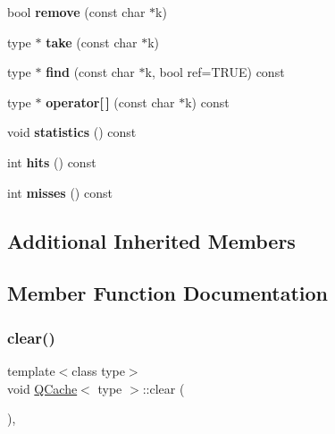 \begin{DoxyCompactItemize}
\item 
\mbox{\label{class_q_cache_af15e202b424c583974d00e269d782f42}} 
bool {\bfseries remove} (const char $\ast$k)
\item 
\mbox{\label{class_q_cache_ad2af9bf86686f51036cfca7f1c62804f}} 
type $\ast$ {\bfseries take} (const char $\ast$k)
\item 
\mbox{\label{class_q_cache_a1d4d4db95a948d64f780b533edccd95b}} 
type $\ast$ {\bfseries find} (const char $\ast$k, bool ref=T\+R\+UE) const
\item 
\mbox{\label{class_q_cache_a0444fd702f2a39070cbc954704f9918d}} 
type $\ast$ {\bfseries operator\mbox{[}$\,$\mbox{]}} (const char $\ast$k) const
\item 
\mbox{\label{class_q_cache_abb5ced14583833be383387206111a14a}} 
void {\bfseries statistics} () const
\item 
\mbox{\label{class_q_cache_a8cb59b27a8a69f06d36d3f94a5aeb669}} 
int {\bfseries hits} () const
\item 
\mbox{\label{class_q_cache_aadf0d7de38727d09993b704a7db92cb2}} 
int {\bfseries misses} () const
\end{DoxyCompactItemize}
\subsection*{Additional Inherited Members}


\subsection{Member Function Documentation}
\mbox{\label{class_q_cache_a23066e089d1e7de0fc1f5ba85bd05719}} 
\subsubsection{\texorpdfstring{clear()}{clear()}}
{\footnotesize\ttfamily template$<$class type$>$ \\
void \mbox{\hyperlink{class_q_cache}{Q\+Cache}}$<$ type $>$\+::clear (\begin{DoxyParamCaption}{ }\end{DoxyParamCaption})\hspace{0.3cm}{\ttfamily [inline]}, {\ttfamily [virtual]}}

